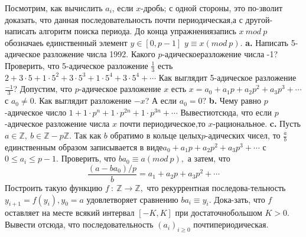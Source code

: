 \documentclass{mai_book}
\begin{document}
    \noindent Посмотрим, как вычислить $a_i$, если $x$-дробь; с одной стороны, это по-\newline зволит доказать, что данная последовательность почти периодическая,\newline а с другой-написать алгоритм поиска периода. До конца упражнения\newline запись $x\ mod\ p$ обозначаеь единственный элемент $y\in
[0,p-1]$ $y\equiv x$\newline $(mod\ p).$\newline
\hspace*{15pt}\textbf{a.} Написать 5-адическое разложение числа 1992. Какого $p$-адическое\newline разложение числа -1? Проверить, что 5-адическое разложение $\frac{1}{3}$ есть\newline $2+3\cdot5+1\cdot5^2+3\cdot5^3+1\cdot5^4+3\cdot5^4+\cdots$ Как выглядит 5-адическое разложение\newline $\frac{-1}{3}$? Допустим, что $p$-адическое разложение $x$ есть $x=a_0+a_1p+a_2p^2+$\newline $a_3p^3+\cdots$ с $a_0\neq 0$. Как выглядит разложение $-x$? А если $a_0=0?$\newline
\hspace*{15pt}\textbf{b.} Чему равно $p$-адическое число $1+1\cdot p^n+1\cdot p^{2n}+1\cdot p^{3n}+\cdots$ Вывести\newline отсюда, что если $p$-адическое разложение числа $x$ почти периодическое,\newline то $x$-рациональное.\newline
\hspace*{15pt}\textbf{c.} Пусть $a\in \mathbb{Z},\ b\in \mathbb{Z}-p\mathbb{Z}.$ Так как $b$ обратимо в кольце целых\newline $p$-адических чисел, то $\frac{a}{b}$ единственным образом записывается в виде\newline $a_0+a_1p+a_2p^2+a_3p^3+\cdots$ с $0\leqslant a_i\leqslant p-1.$ Проверить, что $ba_0\equiv a$\newline $(mod\ p),$ а затем, что 
        $$
        \frac{(a-ba_0)/p}{b}=a_1+a_2p+a_3p^2+\cdots
        $$
        Построить такую функцию $f\ :\ \mathbb{Z}\rightarrow\mathbb{Z},$ что рекуррентная последова-\newline тельность $y_{i+1}=f(y_i), y_0=a$ удовлетворяет сравнению $ba_i\equiv y_i.$ Дока-\newline зать, что $f$ оставляет на месте всякий интервал $[-K,K]$ при достаточно\newline большом $K>0.$ Вывести отсюда, что последовательность $(a_i)_{i\geqslant 0}$ почти\newline периодическая.\newline
\end{document}
